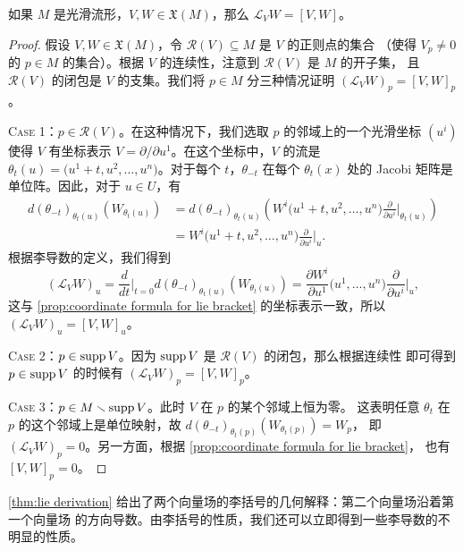 \begin{theorem}\label{thm:lie derivation}
  如果 $M$ 是光滑流形，$V,W\in\mathfrak X(M)$，那么 $\mathcal L_VW=[V,W]$。
\end{theorem}
\begin{proof}
  假设 $V,W\in\mathfrak X(M)$，令 $\mathcal R(V)\subseteq M$ 是 $V$ 的正则点的集合
  （使得 $V_p\neq 0$ 的 $p\in M$ 的集合）。根据 $V$ 的连续性，注意到 $\mathcal R(V)$ 是 $M$ 的开子集，
  且 $\mathcal R(V)$ 的闭包是 $V$ 的支集。我们将 $p\in M$ 分三种情况证明 $(\mathcal L_VW)_p=[V,W]_p$。
  
  \textsc{Case 1}：$p\in\mathcal R(V)$。在这种情况下，我们选取 $p$ 的邻域上的一个光滑坐标
  $(u^i)$ 使得 $V$ 有坐标表示 $V=\partial/\partial u^1$。在这个坐标中，$V$ 的流是
  $\theta_t(u)=\bigl(u^1+t,u^2,\dots,u^n\bigr)$。对于每个 $t$，$\theta_{-t}$ 在每个
  $\theta_t(x)$ 处的 Jacobi 矩阵是单位阵。因此，对于 $u\in U$，有
  \begin{align*}
    d(\theta_{-t})_{\theta_t(u)}(W_{\theta_t(u)})&=
    d(\theta_{-t})_{\theta_t(u)}\left(
      W^i\bigl(u^1+t,u^2,\dots,u^n\bigr)\frac{\partial}{\partial u^i}\bigg|_{\theta_t(u)}
    \right)\\
    &=W^i\bigl(u^1+t,u^2,\dots,u^n\bigr)\frac{\partial}{\partial u^i}\bigg|_{u}.
  \end{align*}
  根据李导数的定义，我们得到
  \[
    (\mathcal L_VW)_u=\frac{d}{dt}\bigg|_{t=0}d(\theta_{-t})_{\theta_t(u)}(W_{\theta_t(u)})
    =\frac{\partial W^i}{\partial u^1}\bigl(u^1,\dots,u^n\bigr)\frac{\partial}{\partial u^i}\bigg|_{u},
  \]
  这与 \autoref{prop:coordinate formula for lie bracket} 的坐标表示一致，所以
  $(\mathcal L_VW)_u=[V,W]_u$。

  \textsc{Case 2}：$p\in\operatorname{supp} V$。因为 $\operatorname{supp} V$ 是 $\mathcal R(V)$ 的闭包，那么根据连续性
  即可得到 $p\in\operatorname{supp} V$ 的时候有 $(\mathcal L_VW)_p=[V,W]_p$。

  \textsc{Case 3}：$p\in M\smallsetminus \operatorname{supp} V$。此时 $V$ 在 $p$ 的某个邻域上恒为零。
  这表明任意 $\theta_t$ 在 $p$ 的这个邻域上是单位映射，故 $d(\theta_{-t})_{\theta_t(p)}(W_{\theta_t(p)})=W_p$，
  即 $(\mathcal L_VW)_p=0$。另一方面，根据 \autoref{prop:coordinate formula for lie bracket}，
  也有 $[V,W]_p=0$。
\end{proof}

\autoref{thm:lie derivation} 给出了两个向量场的李括号的几何解释：第二个向量场沿着第一个向量场
的方向导数。由李括号的性质，我们还可以立即得到一些李导数的不明显的性质。

